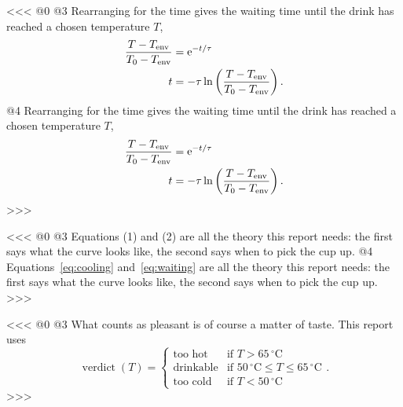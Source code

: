<<<
@0
@3
Rearranging for the time gives the waiting time until the drink has reached a chosen temperature $T$,
\begin{align}
    \frac{T - T_{\mathrm{env}}}{T_0 - T_{\mathrm{env}}} &= \mathrm{e}^{-t/\tau} \notag \\
    t &= -\tau \ln \left( \frac{T - T_{\mathrm{env}}}{T_0 - T_{\mathrm{env}}} \right).
\end{align}
@4
Rearranging for the time gives the waiting time until the drink has reached a chosen temperature $T$,
\begin{align}
    \frac{T - T_{\mathrm{env}}}{T_0 - T_{\mathrm{env}}} &= \mathrm{e}^{-t/\tau} \notag \\
    t &= -\tau \ln \left( \frac{T - T_{\mathrm{env}}}{T_0 - T_{\mathrm{env}}} \right). \label{eq:waiting}
\end{align}
>>>

<<<
@0
@3
Equations (1) and (2) are all the theory this report needs: the first says what the curve looks like,
the second says when to pick the cup up.
@4
Equations~\eqref{eq:cooling} and~\eqref{eq:waiting} are all the theory this report needs: the first says what the curve looks like,
the second says when to pick the cup up.
>>>

<<<
@0
@3
What counts as pleasant is of course a matter of taste.
This report uses
\[
    \operatorname{verdict}(T) =
    \begin{cases}
        \text{too hot}   & \text{if } T > 65\,^{\circ}\mathrm{C} \\
        \text{drinkable} & \text{if } 50\,^{\circ}\mathrm{C} \leq T \leq 65\,^{\circ}\mathrm{C} \\
        \text{too cold}  & \text{if } T < 50\,^{\circ}\mathrm{C}
    \end{cases}
    .
\]
>>>

